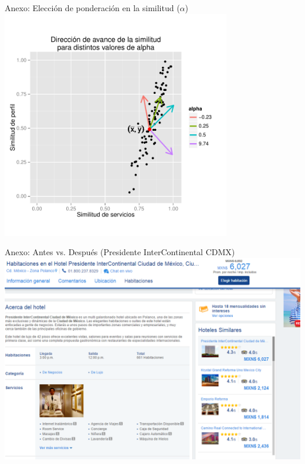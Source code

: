 \documentclass{beamer}
\begin{document}
\begin{frame}{Anexo: Elección de ponderación en la similitud ($\alpha$)}
	\centering
	\includegraphics[width=0.75\textwidth]{imagenes/alpha.pdf}
\end{frame}

\begin{frame}{Anexo: Antes vs. Después (Presidente InterContinental CDMX)}
	\centering
	\includegraphics[width=\textwidth]{imagenes/presidente_intercontinental_bestday1.PNG}
\end{frame}
\end{document}
